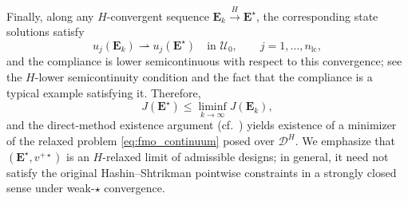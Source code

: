 \documentclass[preprint,3p]{elsarticle}
\newcommand{\tens}[1]{\bm{\mathit{#1}}}             %
\newcommand{\tensf}[1]{\bm{\mathbf{#1}}}            %
\newcommand{\nlc}{n_\mathrm{lc}}                    %
\begin{document}
Finally, along any $H$-convergent sequence $\tensf E_k \xrightarrow{H} \tensf E^\star$, the corresponding state solutions satisfy
\[
\tens u_{j}(\tensf E_k)\rightharpoonup \tens u_{j}(\tensf E^\star)\quad\text{in }\mathcal U_0,\qquad j=1,\dots,\nlc,
\]
and the compliance is lower semicontinuous with respect to this convergence; see the $H$-lower semicontinuity condition \citep[(2.14)]{Haslinger2010} and the fact that the compliance is a typical example satisfying it. Therefore,
%
\begin{equation}
J(\tensf E^\star)\le \liminf_{k\to\infty} J(\tensf E_k),
\end{equation}
%
and the direct-method existence argument (cf.\ \citep[Theorem~2.8]{Haslinger2010}) yields existence of a minimizer of the relaxed problem \eqref{eq:fmo_continuum} posed over $\mathcal D^H$. We emphasize that $(\tensf E^\star,v^{+\star})$ is an $H$-relaxed limit of admissible designs; in general, it need not satisfy the original Hashin--Shtrikman pointwise constraints in a strongly closed sense under weak-$\star$ convergence.
\end{document}
